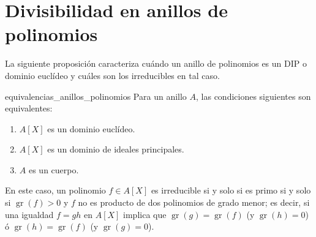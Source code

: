 \clearpage
\section{Divisibilidad en anillos de polinomios}

La siguiente proposición caracteriza cuándo un anillo de polinomios es un DIP o dominio euclídeo y cuáles son los irreducibles en tal caso.

\begin{proposition}{}{equivalencias_anillos_polinomios}
Para un anillo $A$, las condiciones siguientes son equivalentes:

\begin{enumerate}
\item $A[X]$ es un dominio euclídeo.
\item $A[X]$ es un dominio de ideales principales.
\item $A$ es un cuerpo.
\end{enumerate}

En este caso, un polinomio $f \in A[X]$ es irreducible si y solo si es primo si y solo si $\operatorname{gr}(f) > 0$ y $f$ no es producto de dos polinomios de grado menor; es decir, si una igualdad $f = gh$ en $A[X]$ implica que $\operatorname{gr}(g) = \operatorname{gr}(f)$ (y $\operatorname{gr}(h) = 0$) ó $\operatorname{gr}(h) = \operatorname{gr}(f)$ (y $\operatorname{gr}(g) = 0$).
\end{proposition}

